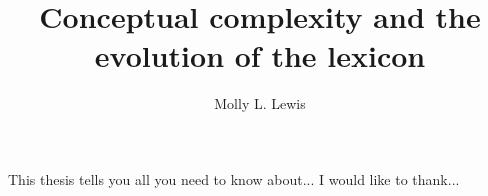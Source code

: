 \documentclass[12pt]{report}
\begin{document}
\title{Conceptual complexity and the evolution of the lexicon}
\author{Molly L. Lewis}
 
\beforepreface 
{}
This thesis tells you all you need to know about...
I would like to thank...


\afterpreface












\end{document}
